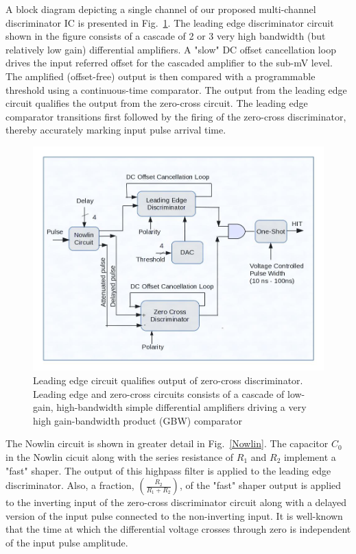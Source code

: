 \documentclass[12pt, onecolumn]{IEEEtran}
\begin{document}
\noindent
\newline
A block diagram depicting a single channel of our proposed multi-channel discriminator IC is presented in Fig.~\ref{BlockDiagram}. The leading edge discriminator circuit shown in the figure consists of a cascade of 2 or 3 very high bandwidth (but relatively low gain) differential amplifiers. A "slow" DC offset cancellation loop drives the input referred offset for the cascaded amplifier to the sub-mV level. The amplified (offset-free) output is then compared with a programmable threshold using a continuous-time comparator.  The output from the leading edge circuit qualifies the output from the zero-cross circuit.  The leading edge comparator transitions first followed by the firing of the zero-cross discriminator, thereby accurately marking input pulse arrival time. \\

\begin{figure}[htbp!]
	\centering
 	\includegraphics[scale=0.5,keepaspectratio=true]{./images/DISC16block.jpg}
 	\caption{Leading edge circuit qualifies output of zero-cross discriminator.  Leading edge and zero-cross circuits consists of a cascade of low-gain, high-bandwidth simple differential amplifiers driving a very high gain-bandwidth product (GBW) comparator }
 	\label{BlockDiagram}
\end{figure}

\noindent
The Nowlin circuit is shown in greater detail in Fig.~\ref{Nowlin}.  The capacitor $C_0$ in the Nowlin cicuit along with the series resistance of $R_1$ and $R_2$ implement a "fast" shaper.  The output of this highpass filter is applied to the leading edge discriminator. Also, a fraction, $(\frac{R_2}{R_1 + R_2})$, of the "fast" shaper output is applied to the inverting input of the zero-cross discriminator circuit along with a delayed version of the input pulse connected to the non-inverting input. It is well-known that the time at which the differential voltage crosses through zero is independent of the input pulse amplitude.\\
\end{document}
